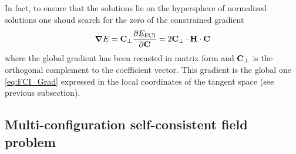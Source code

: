 \documentclass[11pt,a4paper]{article}
\newcommand{\FCI}{\text{FCI}}
\begin{document}
In fact, to ensure that the solutions lie on the hypersphere of normalized solutions one shoud search for the zero of the constrained gradient
\begin{equation}
  \label{eq:FCI_ConstrainedGrad}
  \grad E = \vb{C}_{\perp} \pdv{E_{\FCI}}{\vb{C}} = 2 \vb{C}_{\perp}\cdot\vb{H}\cdot\vb{C}
\end{equation}
where the global gradient has been recasted in matrix form and $\vb{C}_{\perp}$ is the orthogonal complement to the coefficient vector.
This gradient is the global one \eqref{eq:FCI_Grad} expressed in the local coordinates of the tangent space (see previous subsection).

\subsection{Multi-configuration self-consistent field problem}
\end{document}
